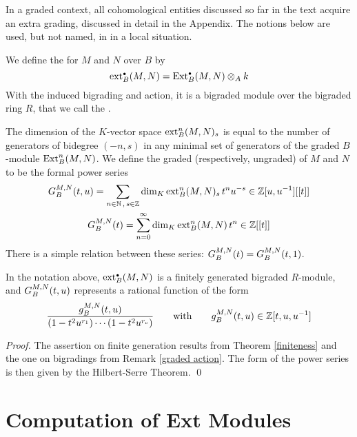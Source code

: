 In a graded context, all cohomological entities discussed so far in the
text acquire an extra grading, discussed in detail in the Appendix.
The notions below are used, but not named, in \cite{CI:AB2} in a local
situation.

\begin{Remark}
\label{reduced ext}
We define the {\it{}\/} for $M$ and $N$ over $B$ 
by
\[
\operatorname{ext}^{\scriptscriptstyle\bullet}_B(M,N)=\operatorname{Ext}^{\scriptscriptstyle\bullet}_B(M,N)\otimes_Ak
\]
With the induced bigrading and action, it is a bigraded module over the
bigraded ring $R$, that we call the {\it{}\/}.

The dimension of the $K$-vector space $\operatorname{ext}^n_B(M,N)_{s}$ is equal to
the number of generators of bidegree $(-n,s)$ in any minimal set of
generators of the graded $B$-module $\operatorname{Ext}^n_B(M,N)$.  We define the
graded (respectively, ungraded) {\it{}\/} of $M$
and $N$ to be the formal power series
\begin{gather*}
{G}_B^{M,N}(t,u)=
\sum_{n\in{\mathbb N}\,,\,s\in{\mathbb Z}}\dim_K \operatorname{ext}^n_B(M,N)_{s}\, t^n u^{-s}
\in{\mathbb Z}[u,u^{-1}][[t]]\\
{G}_B^{M,N}(t)=
\sum_{n=0}^\infty\dim_K \operatorname{ext}^n_B(M,N)\, t^n
\in{\mathbb Z}[[t]]
\end{gather*}
There is a simple relation between these series: ${G}_B^{M,N}(t)=
{G}_B^{M,N}(t,1)$.
 \end{Remark}

\begin{corollary}
\label{series}
In the notation above, $\operatorname{ext}^{\scriptscriptstyle\bullet}_B(M,N)$ is a finitely generated
bigraded $R$-module, and ${G}_B^{M,N}(t,u)$ represents a rational
function of the form
\begin{equation*}
\frac{g_B^{M,N}(t,u)}{(1-t^2u^{r_1})\cdots(1-t^2u^{r_c})}
\qquad\text{with}\qquad g_B^{M,N}(t,u)\in{\mathbb Z}[t,u,u^{-1}]
\end{equation*}
\end{corollary}

\begin{proof}
The assertion on finite generation results from Theorem
\ref{finiteness} and the one on bigradings from Remark \ref{graded
action}.  The form of the power series is then given by the
Hilbert-Serre Theorem. \qed
 \end{proof}

\section{Computation of Ext Modules}
\label{Computation of Ext modules}

